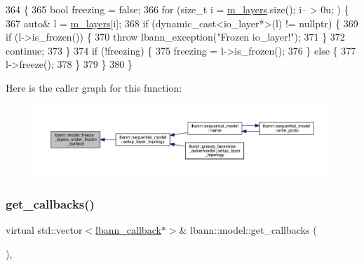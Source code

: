 \begin{DoxyCode}
364                                                \{
365   \textcolor{keywordtype}{bool} freezing = \textcolor{keyword}{false};
366   \textcolor{keywordflow}{for} (\textcolor{keywordtype}{size\_t} i = \hyperlink{classlbann_1_1model_a0229fc226ec163d1411548446104569d}{m\_layers}.size(); i-- > 0u; ) \{
367     \textcolor{keyword}{auto}& l = \hyperlink{classlbann_1_1model_a0229fc226ec163d1411548446104569d}{m\_layers}[i];
368     \textcolor{keywordflow}{if} (dynamic\_cast<io\_layer*>(l) != \textcolor{keyword}{nullptr}) \{
369       \textcolor{keywordflow}{if} (l->is\_frozen()) \{
370         \textcolor{keywordflow}{throw} lbann\_exception(\textcolor{stringliteral}{"Frozen io\_layer!"});
371       \}
372       \textcolor{keywordflow}{continue};
373     \}
374     \textcolor{keywordflow}{if} (!freezing) \{
375       freezing = l->is\_frozen();
376     \} \textcolor{keywordflow}{else} \{
377       l->freeze();
378     \}
379   \}
380 \}
\end{DoxyCode}
Here is the caller graph for this function\+:\nopagebreak
\begin{figure}[H]
\begin{center}
\leavevmode
\includegraphics[width=350pt]{classlbann_1_1model_ad0131e36e763470a7bbf67e83b42cd14_icgraph}
\end{center}
\end{figure}
\mbox{\label{classlbann_1_1model_a38c71a455870e087c4c07acb78e4477c}} 
\subsubsection{\texorpdfstring{get\+\_\+callbacks()}{get\_callbacks()}}
{\footnotesize\ttfamily virtual std\+::vector$<$\hyperlink{classlbann_1_1lbann__callback}{lbann\+\_\+callback}$\ast$$>$\& lbann\+::model\+::get\+\_\+callbacks (\begin{DoxyParamCaption}{ }\end{DoxyParamCaption})\hspace{0.3cm}{\ttfamily [inline]}, {\ttfamily [virtual]}}

